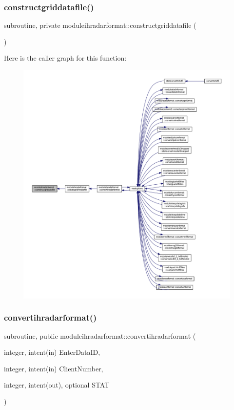\subsubsection{\texorpdfstring{constructgriddatafile()}{constructgriddatafile()}}
{\footnotesize\ttfamily subroutine, private moduleihradarformat\+::constructgriddatafile (\begin{DoxyParamCaption}{ }\end{DoxyParamCaption})\hspace{0.3cm}{\ttfamily [private]}}

Here is the caller graph for this function\+:\nopagebreak
\begin{figure}[H]
\begin{center}
\leavevmode
\includegraphics[width=350pt]{namespacemoduleihradarformat_a02661cf4395883e003f6785721da99e9_icgraph}
\end{center}
\end{figure}
\mbox{\label{namespacemoduleihradarformat_a98ed94c78a186e13367d60ca010104fb}} 
\subsubsection{\texorpdfstring{convertihradarformat()}{convertihradarformat()}}
{\footnotesize\ttfamily subroutine, public moduleihradarformat\+::convertihradarformat (\begin{DoxyParamCaption}\item[{integer, intent(in)}]{Enter\+Data\+ID,  }\item[{integer, intent(in)}]{Client\+Number,  }\item[{integer, intent(out), optional}]{S\+T\+AT }\end{DoxyParamCaption})}

